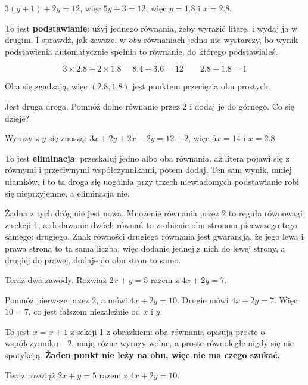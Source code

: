 \begin{fr}
\begin{ansblock}
$3(y + 1) + 2y = 12$, więc $5y + 3 = 12$, więc $y = \num{1.8}$ i
$x = \num{2.8}$.
\end{ansblock}

To jest \textbf{podstawianie}: użyj jednego równania, żeby wyrazić literę, i
wydaj ją w drugim. I sprawdź, jak zawsze, w \emph{obu} równaniach \dash{}
jedno nie wystarczy, bo wynik podstawienia automatycznie spełnia to równanie,
do którego podstawiałeś.

\[ 3 \times \num{2.8} + 2 \times \num{1.8} = \num{8.4} + \num{3.6} = 12
   \qquad \num{2.8} - \num{1.8} = 1 \]

Oba się zgadzają, więc $(\num{2.8}, \num{1.8})$ jest punktem przecięcia obu
prostych.

Jest druga droga. Pomnóż dolne równanie przez $2$ i dodaj je do górnego. Co
się dzieje?
\nextframe
\end{fr}

\begin{fr}
\begin{ansblock}
Wyrazy z $y$ się znoszą: $3x + 2y + 2x - 2y = 12 + 2$, więc $5x = 14$ i
$x = \num{2.8}$.
\end{ansblock}

To jest \textbf{eliminacja}: przeskaluj jedno albo oba równania, aż litera
pojawi się z równymi i przeciwnymi współczynnikami, potem dodaj. Ten sam
wynik, mniej ułamków, i to ta droga się uogólnia \dash{} przy trzech
niewiadomych podstawianie robi się nieprzyjemne, a eliminacja nie.

Żadna z tych dróg nie jest nowa. Mnożenie równania przez $2$ to reguła
równowagi z sekcji 1, a dodawanie dwóch równań to zrobienie obu stronom
pierwszego tego samego: drugiego. Znak równości drugiego równania jest
gwarancją, że jego lewa i prawa strona to ta sama liczba, więc dodanie jednej
z nich do lewej strony, a drugiej do prawej, dodaje do obu stron to samo.

Teraz dwa zawody. Rozwiąż $2x + y = 5$ razem z $4x + 2y = 7$.
\dotline
\nextframe
\end{fr}

\begin{fr}
Pomnóż pierwsze przez $2$, a mówi $4x + 2y = 10$. Drugie mówi $4x + 2y = 7$.
Więc $10 = 7$, co jest fałszem niezależnie od $x$ i $y$.

To jest $x = x + 1$ z sekcji 1 z obrazkiem: oba równania opisują proste o
współczynniku $-2$, mają różne wyrazy wolne, a proste równoległe nigdy się nie
spotykają. \textbf{Żaden punkt nie leży na obu, więc nie ma czego szukać.}

Teraz rozwiąż $2x + y = 5$ razem z $4x + 2y = 10$.
\nextframe
\end{fr}

